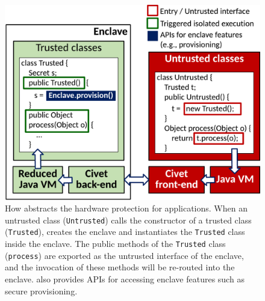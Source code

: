
 
\begin{figure}[t!]
	\centering
	\includegraphics[width=0.9\linewidth]{civet/figures/synthesis-new.pdf}
	\footnotesize
	\caption{How \systemname{} abstracts the \sgx{} hardware protection for \java{} applications.
		When an untrusted class ({\tt Untrusted}) calls the constructor of a trusted class ({\tt Trusted}),
		\systemname{} creates the enclave and instantiates the {\tt Trusted} class
		inside the enclave. 
		The public methods of the {\tt Trusted} class ({\tt process}) are exported
		as the untrusted interface of the enclave, and the invocation of these methods will be re-routed into the enclave.
		\systemname{} also provides APIs for accessing enclave features such as secure provisioning.
	}
	\label{fig:synthesis}
\end{figure}


